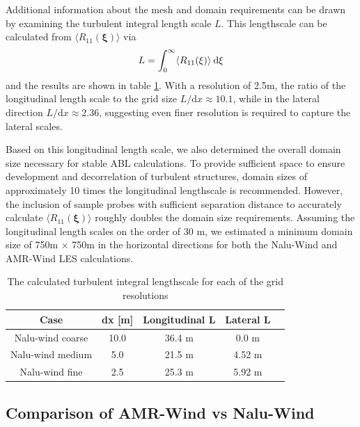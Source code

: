 Additional information about the mesh and domain requirements can be
drawn by examining the turbulent integral length scale $L$.  This
lengthscale can be calculated from $\langle R_{11}(\boldsymbol{\xi})
\rangle$ via
\begin{equation}
  L = \int_0^\infty \langle R_{11}(\xi) \rangle \: {\textrm d}\xi
\end{equation}
and the results are shown in table \ref{tab:GridStudyLscale}.  With a
resolution of 2.5m, the ratio of the longitudinal length scale to the
grid size $L/\textrm{d}x \approx 10.1$, while in the lateral direction
$L/\textrm{d}x \approx 2.36$, suggesting even finer resolution is
required to capture the lateral scales.

Based on this longitudinal length scale, we also determined the
overall domain size necessary for stable ABL calculations.  To provide
sufficient space to ensure development and decorrelation of turbulent
structures, domain sizes of approximately 10 times the longitudinal
lengthscale is recommended.  However, the inclusion of sample probes
with sufficient separation distance to accurately calculate $\langle
R_{11}(\boldsymbol{\xi}) \rangle$ roughly doubles the domain size
requirements.  Assuming the longitudinal length scales on the order of
30 m, we estimated a minimum domain size of 750m $\times$ 750m in the
horizontal directions for both the Nalu-Wind and AMR-Wind LES
calculations.

\begin{table} %
\caption{\label{tab:GridStudyLscale} The calculated turbulent integral
  lengthscale for each of the grid resolutions} \centering
\begin{tabular}{ccccc}
  \hline
  Case              & dx [m] & Longitudinal L  & Lateral L \\
  \hline
  Nalu-wind coarse  &  10.0  & 36.4 m         & 0.0 m     \\
  Nalu-wind medium  &   5.0  & 21.5 m         & 4.52 m    \\
  Nalu-wind fine    &   2.5  & 25.3 m         & 5.92 m    \\
\hline
\end{tabular}
\end{table}

\subsection{Comparison of AMR-Wind vs Nalu-Wind}

